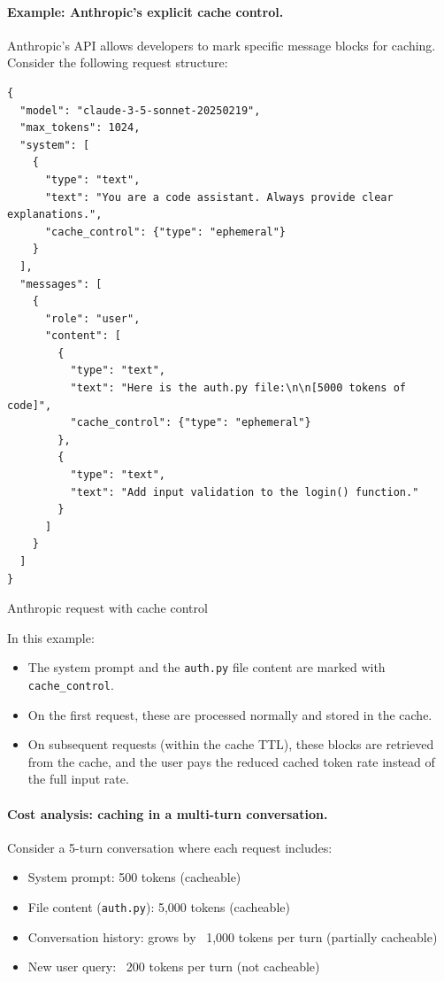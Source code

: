 \documentclass[english]{article}
\begin{document}
\paragraph{Example: Anthropic's explicit cache control.}

Anthropic's API allows developers to mark specific message blocks for caching. Consider the following request structure:

\begin{listing}[H]
\begin{verbatim}
{
  "model": "claude-3-5-sonnet-20250219",
  "max_tokens": 1024,
  "system": [
    {
      "type": "text",
      "text": "You are a code assistant. Always provide clear explanations.",
      "cache_control": {"type": "ephemeral"}
    }
  ],
  "messages": [
    {
      "role": "user",
      "content": [
        {
          "type": "text",
          "text": "Here is the auth.py file:\n\n[5000 tokens of code]",
          "cache_control": {"type": "ephemeral"}
        },
        {
          "type": "text",
          "text": "Add input validation to the login() function."
        }
      ]
    }
  ]
}
\end{verbatim}
\caption{Anthropic request with cache control}
\end{listing}

In this example:
\begin{itemize}
    \item The system prompt and the \texttt{auth.py} file content are marked with \texttt{cache\_control}.
    \item On the first request, these are processed normally and stored in the cache.
    \item On subsequent requests (within the cache TTL), these blocks are retrieved from the cache, and the user pays the reduced cached token rate instead of the full input rate.
\end{itemize}

\paragraph{Cost analysis: caching in a multi-turn conversation.}

Consider a 5-turn conversation where each request includes:
\begin{itemize}
    \item System prompt: 500 tokens (cacheable)
    \item File content (\texttt{auth.py}): 5,000 tokens (cacheable)
    \item Conversation history: grows by ~1,000 tokens per turn (partially cacheable)
    \item New user query: ~200 tokens per turn (not cacheable)
\end{itemize}
\end{document}
